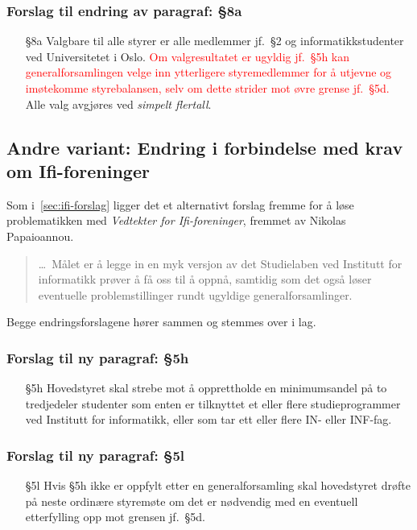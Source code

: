 \documentclass[10pt,norsk,a4paper]{article}
\begin{document}
\subsubsection{Forslag til endring av paragraf: §8a}
\begin{enumerate}
	\item[§8a]
		Valgbare til alle styrer er alle medlemmer jf.~§2 og informatikkstudenter ved
		Universitetet i Oslo. 
		\textcolor{red}{%
			Om valgresultatet er ugyldig jf.~§5h kan
			generalforsamlingen velge inn ytterligere styremedlemmer for å utjevne og imøtekomme
			styrebalansen, selv om dette strider mot øvre grense jf.~§5d.
		}Alle valg avgjøres ved \textit{simpelt flertall}.
\end{enumerate}


\subsection{Andre variant: Endring i forbindelse med krav om Ifi-foreninger}

Som i~\ref{sec:ifi-forslag} ligger det et alternativt forslag fremme for å løse problematikken med \textit{Vedtekter for Ifi-foreninger}, fremmet av Nikolas Papaioannou.

\begin{quote}
	\ldots\ Målet er å legge in en myk versjon av det Studielaben ved Institutt for informatikk prøver å få oss til å oppnå, samtidig som det også løser eventuelle problemstillinger rundt ugyldige generalforsamlinger.
\end{quote}

Begge endringsforslagene hører sammen og stemmes over i lag.

\subsubsection{Forslag til ny paragraf: §5h}

\begin{itemize}
	\item[§5h] Hovedstyret skal strebe mot å opprettholde en minimumsandel på to tredjedeler studenter som enten er tilknyttet et eller flere studieprogrammer ved Institutt for informatikk, eller som tar ett eller flere IN- eller INF-fag.
\end{itemize}

\subsubsection{Forslag til ny paragraf: §5l}
\begin{itemize}
	\item[§5l] Hvis §5h ikke er oppfylt etter en generalforsamling skal hovedstyret drøfte på neste
		ordinære styremøte om det er nødvendig med en eventuell etterfylling opp mot grensen
		jf.~§5d.
\end{itemize}
\end{document}
